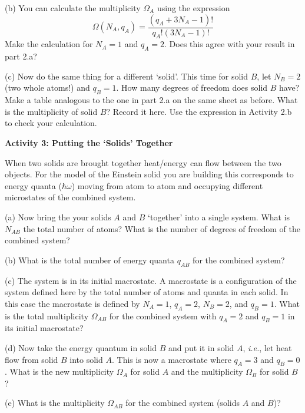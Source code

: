 (b) You can calculate the multiplicity $\Omega_A$ using the expression
\begin{equation}
\Omega(N_A,q_A) = \frac{(q_A + 3N_A -1)!}{q_A! (3N_A-1)!}
\end{equation}
Make the calculation for $N_A = 1$ and $q_A = 2$.
Does this agree with your result in part 2.a?
\vspace{15mm}

(c) Now do the same thing for a different `solid'.
This time for solid $B$, let $N_B = 2$ (two whole atoms!) and $q_B = 1$.
How many degrees of freedom does solid $B$ have?
Make a table analogous to the one in part 2.a on the same sheet as before.
What is the multiplicity of solid $B$?
Record it here.
Use the expression in Activity 2.b to check your calculation.
\vspace{45mm}

\textbf{Activity 3: Putting the `Solids' Together}

When two solids are brought together heat/energy can flow between the two objects.
For the model of the Einstein solid you are building this corresponds to 
energy quanta ($\hbar \omega$) moving from atom to atom and occupying different
microstates of the combined system.

(a) Now bring the your solids $A$ and $B$ `together' into a single system.
What is $N_{AB}$ the total number of atoms?
What is the number of degrees of freedom of the combined system?
\vspace{10mm}

(b) What is the total number of energy quanta $q_{AB}$ for the combined system?
\vspace{10mm}

(c) The system is in its initial macrostate.
A macrostate is a configuration of the system defined here by the total number
of atoms and quanta in each solid.
In this case the macrostate is defined by $N_A=1$, $q_A=2$, $N_B=2$, and $q_B= 1$.
 What is the total multiplicity $\Omega_{AB}$ for the combined system
with $q_A=2$ and $q_B=1$ in its initial macrostate?
\vspace{15mm}

(d) Now take the energy quantum in solid $B$ and put it in solid $A$,
{\it i.e.}, let heat flow from solid $B$ into solid $A$.
This is now a macrostate where $q_A=3$ and $q_B=0$.
What is the new multiplicity $\Omega_A$ for solid $A$ and the  multiplicity $\Omega_B$ for solid $B$?
\vspace{20mm}

(e) What is the multiplicity $\Omega_{AB}$ for the combined system (solids $A$ and $B$)?
\vspace{15mm}

